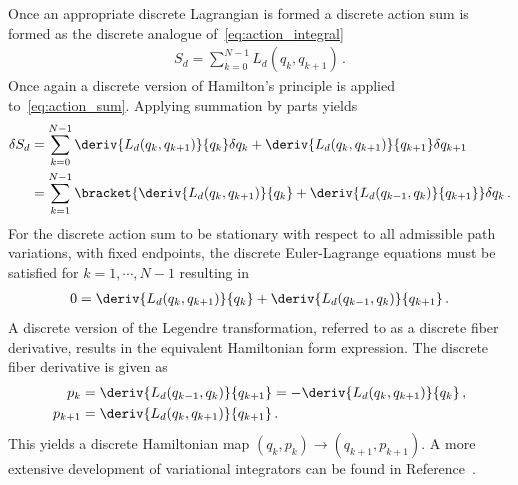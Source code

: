 Once an appropriate discrete Lagrangian is formed a discrete action sum is formed as the discrete analogue of~\cref{eq:action_integral}
\begin{align}\label{eq:action_sum}
	S_d = \sum_{k=0}^{N-1} L_d(q_k, q_{k+1}) \, .
\end{align}
Once again a discrete version of Hamilton's principle is applied to~\cref{eq:action_sum}.
Applying summation by parts yields
\begin{subequations}
\begin{align}\label{eq:dis_var_principle}
	\delta S_d &= \sum_{k=0}^{N-1} \deriv{L_d(q_k, q_{k+1})}{q_k} \delta q_k + \deriv{L_d(q_k, q_{k+1})}{q_{k+1}} \delta q_{k+1} \\
	&= \sum_{k=1}^{N-1} \bracket{ \deriv{L_d(q_k, q_{k+1})}{q_k} + \deriv{L_d(q_{k-1}, q_k)}{q_{k+1}}} \delta q_k \, .
\end{align}
\end{subequations}
For the discrete action sum to be stationary with respect to all admissible path variations, with fixed endpoints, the discrete Euler-Lagrange equations must be satisfied for \( k = 1, \cdots, N-1 \) resulting in
\begin{align}\label{eq:discrete_euler-lagrange}
	0 = \deriv{L_d(q_k, q_{k+1})}{q_k} + \deriv{L_d(q_{k-1}, q_k)}{q_{k+1}} \, .
\end{align}
A discrete version of the Legendre transformation, referred to as a discrete fiber derivative, results in the equivalent Hamiltonian form expression.
The discrete fiber derivative is given as 
\begin{subequations}\label{eq:discrete_legendre}
\begin{align}
	p_k &= \deriv{L_d(q_{k-1},q_k)}{q_{k+1}} = - \deriv{L_d(q_k, q_{k+1})}{q_k} \, ,\\
	p_{k+1} &= \deriv{L_d(q_k, q_{k+1})}{q_{k+1}} \, .
\end{align}
\end{subequations}
This yields a discrete Hamiltonian map \( (q_k, p_k) \to (q_{k+1}, p_{k+1}) \).
A more extensive development of variational integrators can be found in Reference~\cite{marsden2001}.

